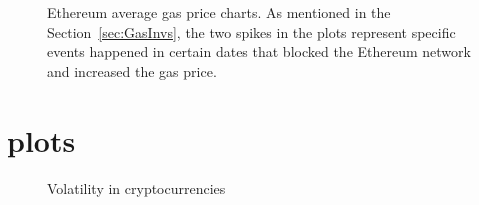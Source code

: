 \begin{figure}[!htb]

	\centering
	\hfill
	\caption {Ethereum average gas price charts. As mentioned in the Section~\ref{sec:GasInvs}, the two spikes in the plots represent specific events happened in certain dates that blocked the Ethereum network and increased the gas price.}
	\label{fig:gas}

\end{figure}






\section{plots}\label{sec:plots}

\begin{figure}[!htb]
	\centering
	\hfill
	\caption{Volatility in cryptocurrencies}
	\label{fig:fiatandcrypto}
\end{figure}


